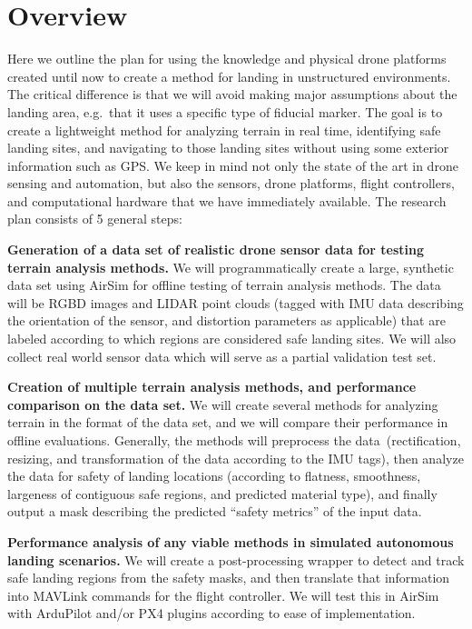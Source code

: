 \section{Overview}
\label{section:research_plan_overview}

Here we outline the plan for using the knowledge and physical drone platforms created
until now to create a method for landing in unstructured environments.
The critical difference is that we will avoid making major assumptions about the landing area,
e.g.~that it uses a specific type of fiducial marker.
The goal is to create a lightweight method for analyzing terrain in real time,
identifying safe landing sites,
and navigating to those landing sites without using some exterior information such as GPS.
We keep in mind not only the state of the art in drone sensing and automation,
but also the sensors, drone platforms, flight controllers,
and computational hardware that we have immediately available.
The research plan consists of 5 general steps:

\textbf{Generation of a data set of realistic drone sensor data for testing terrain analysis methods.}
We will programmatically create a large, synthetic data set using AirSim for offline testing of terrain analysis methods.
The data will be RGBD images and LIDAR point clouds (tagged with IMU data describing the orientation of the sensor, and distortion parameters as applicable)
that are labeled according to which regions are considered safe landing sites.
We will also collect real world sensor data which will serve as a partial validation test set.

\textbf{Creation of multiple terrain analysis methods, and performance comparison on the data set.}
We will create several methods for analyzing terrain in the format of the data set,
and we will compare their performance in offline evaluations.
Generally, the methods will preprocess the data~(rectification, resizing, and transformation of the data according to the IMU tags),
then analyze the data for safety of landing locations (according to flatness, smoothness, largeness of contiguous safe regions, and predicted material type),
and finally output a mask describing the predicted ``safety metrics'' of the input data.

\textbf{Performance analysis of any viable methods in simulated autonomous landing scenarios.}
We will create a post-processing wrapper to detect and track safe landing regions from the safety masks,
and then translate that information into MAVLink commands for the flight controller.
We will test this in AirSim with ArduPilot and/or PX4 plugins according to ease of implementation.

